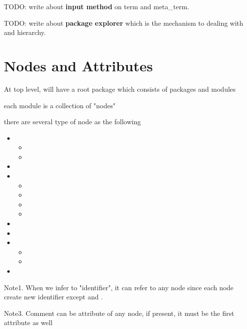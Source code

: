 \documentclass[master.tex]{subfiles}
\begin{document}
TODO: write about \textbf{input method} on term and meta\_term.

TODO: write about \textbf{package explorer} which is the mechanism to dealing with  and  hierarchy.

\newpage

\section{Nodes and Attributes}

At top level, will have a root package which consists of packages and modules

each module is a collection of "nodes"

there are several type of node as the following

\begin{itemize}
    \item \kOpen
    \begin{itemize}
        \item \kShowByDefault
        \item \kHideByDefault
    \end{itemize}
    \item \kComment
    \item \kGrammar
    \begin{itemize}
        \item \kInductive
        \item \kLiteral
        \item \kSequence
        \item \kDictionary
    \end{itemize}
    \item \kDefinition
    \item \kAlias
    \item \kRule
    \begin{itemize}
        \item \kInference
        \item \kCompound
    \end{itemize}
    \item \kTheorem
\end{itemize}

Note1. When we infer to "identifier", it can refer to any node since each node create new identifier except \kOpen and \kComment.

Note3. Comment can be attribute of any node, if present, it must be the first attribute as well
\end{document}
